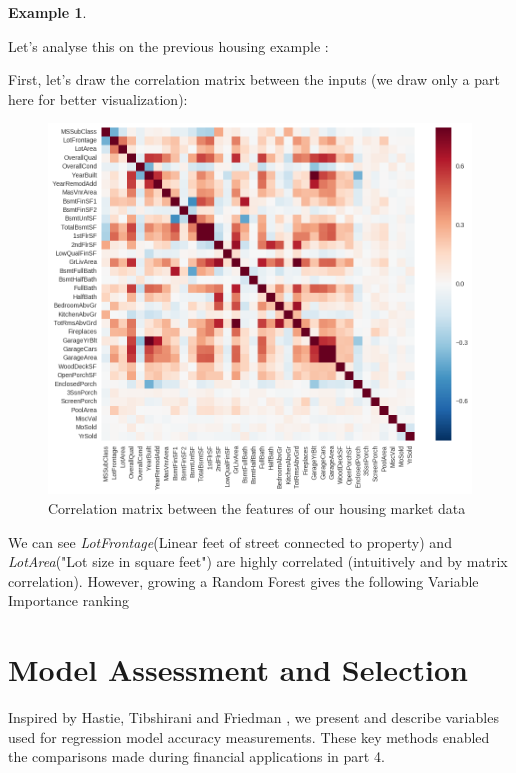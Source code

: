\documentclass[english,11pt,openany]{article}
\theoremstyle{definition}
\theoremstyle{plain}
\theoremstyle{definition}
\newtheorem{Ex}[Th]{Example}
\begin{document}
\begin{appendices}
\begin{Ex}
		\end{Ex}
		
		Let's analyse this on the previous housing example :
		
		First, let's draw the correlation matrix between the inputs (we draw only a part here for better visualization): 
		
		\begin{figure}[!h]
			\label{figure:correlation_matrix}
			\includegraphics[scale=0.6]{RF_analysis/correlation_matrix.png} 
			\caption{Correlation matrix between the features of our housing market data}
		\end{figure}
		
		We can see \textit{LotFrontage}(Linear feet of street connected to property) and \textit{LotArea}("Lot size in square feet") are highly correlated (intuitively and by matrix correlation).
		However, growing a Random Forest gives the following Variable Importance ranking
		
		
		\section{Model Assessment and Selection}
		
		Inspired by Hastie, Tibshirani and Friedman \cite{Friedman:2008}, we present and describe variables used for regression model accuracy measurements.  
		These key methods enabled the comparisons made during financial applications in part 4. 
		

\end{appendices}
\end{document}
